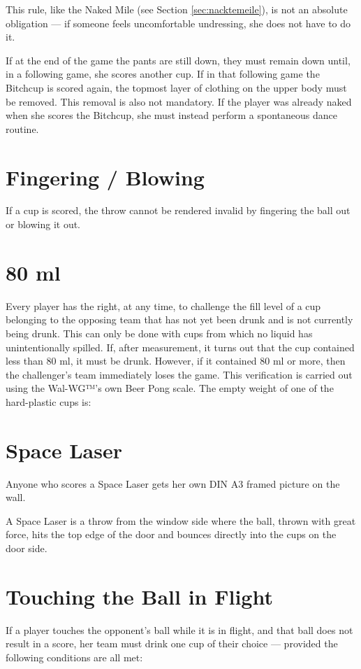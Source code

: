 \documentclass[a5paper, 12pt]{book}
\begin{document}
This rule, like the Naked Mile (see Section \ref{sec:nacktemeile}), is not an absolute obligation — if someone feels uncomfortable undressing, she does not have to do it.

If at the end of the game the pants are still down, they must remain down until, in a following game, she scores another cup.  
If in that following game the Bitchcup is scored again, the topmost layer of clothing on the upper body must be removed.  
This removal is also not mandatory.  
If the player was already naked when she scores the Bitchcup, she must instead perform a spontaneous dance routine.

\section{Fingering / Blowing}\label{sec:fingernblasen}
If a cup is scored, the throw cannot be rendered invalid by fingering the ball out or blowing it out.

\section{80 ml}\label{sec:80ml}
Every player has the right, at any time, to challenge the fill level of a cup belonging to the opposing team that has not yet been drunk and is not currently being drunk.  
This can only be done with cups from which no liquid has unintentionally spilled.  
If, after measurement, it turns out that the cup contained less than 80 ml, it must be drunk.  
However, if it contained 80 ml or more, then the challenger’s team immediately loses the game.  
This verification is carried out using the Wal-WG™’s own Beer Pong scale.  
The empty weight of one of the hard-plastic cups is:

\section{Space Laser}\label{sec:weltraumlaser}
Anyone who scores a Space Laser gets her own DIN A3 framed picture on the wall.  

A Space Laser is a throw from the window side where the ball, thrown with great force, hits the top edge of the door and bounces directly into the cups on the door side.

\section{Touching the Ball in Flight}\label{sec:ballflug}
If a player touches the opponent’s ball while it is in flight, and that ball does not result in a score, her team must drink one cup of their choice — provided the following conditions are all met:
\end{document}
